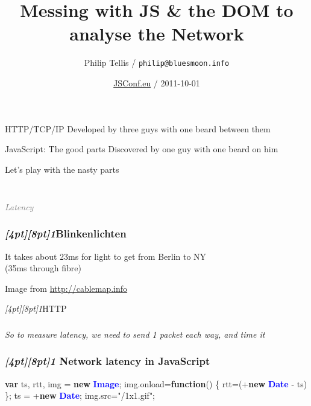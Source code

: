 \documentclass{beamer}
\author{Philip Tellis / \texttt{philip@bluesmoon.info}}
\title{Messing with JS \& the DOM to analyse the Network}
\date{\href{http://jsconf.eu/2011/}{JSConf.eu} / 2011-10-01}
\newcommand{\sn}[1]{\textrm{\textit{\Huge{\raisebox{-3pt}[4pt][8pt]{\textcolor{f2elblue}{#1}}}}}\hspace{4pt}}
\newcommand{\innersplash}[1]{
  \begin{center}
    \large \textrm{\textit{ #1 } }
  \end{center}
}
\newcommand{\splashslide}[2][{}]{
  \begin{frame}
  \frametitle{#1}
  \innersplash{#2}
  \end{frame}
}
\newcommand{\leadinslide}[2]{
  \splashslide{
     {\fontsize{150}{20}\selectfont{\raisebox{0pt}[90pt][0pt]{\textcolor{light-gray}{#1}}}} \\ \huge \textcolor{gray}{#2}
  }
}
\def\green<#1>#2{\textcolor<#1>{dark-green}{\textbf<#1>{#2}}}
\def\blue<#1>#2{\textcolor<#1>{blue}{\textbf<#1>{#2}}}
\begin{document}
\begin{frame}
  \titlepage
\end{frame}


\begin{frame}{HTTP/TCP/IP}
\vspace{-4cm}
Developed by three guys with one beard between them
\end{frame}

\begin{frame}{JavaScript: The good parts}
\vspace{-4cm}
Discovered by one guy with one beard on him
\end{frame}

\begin{frame}
Let's play with the nasty parts
\end{frame}

\leadinslide{1}{Latency}

\begin{frame}
\frametitle{\sn{1}Blinkenlichten}
\vspace{6cm}
\begin{center}
It takes about 23ms for light to get from Berlin to NY \\
(35ms through fibre)
\end{center}
\vfill
\tiny Image from \href{http://cablemap.info/}{http://cablemap.info}
\end{frame}

\begin{frame}{\sn{1}HTTP}
\end{frame}

\splashslide{So to measure latency, we need to send 1 packet each way, and time it}

\begin{frame}[fragile]
\frametitle{\sn{1} Network latency in JavaScript}
\begin{semiverbatim}
  \green<1>{var} ts, rtt, img = \green<1>{new} \blue<1>{Image};
  img.onload=\green<1>{function}() \{ rtt=(+\green<1>{new} \blue<1>{Date} - ts) \};
  ts = +\green<1>{new} \blue<1>{Date};
  img.src="/1x1.gif";
\end{semiverbatim}
\end{frame}
\end{document}
